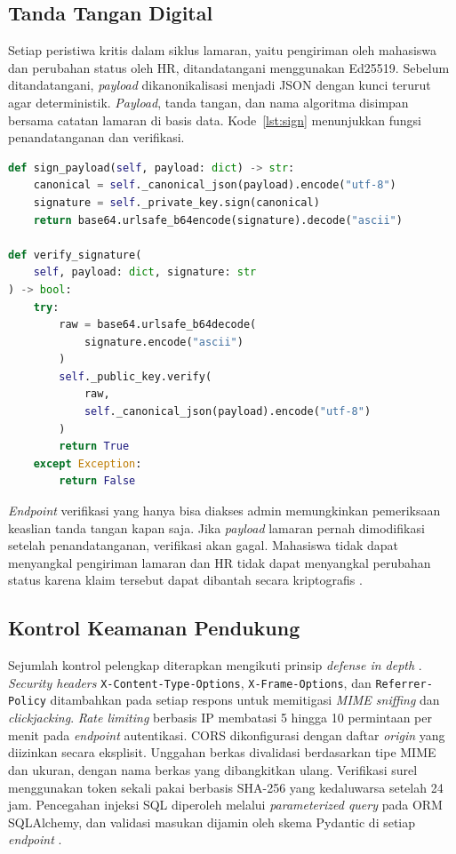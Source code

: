 \documentclass[12pt,a4paper]{article}
\begin{document}
\subsection{Tanda Tangan Digital}

Setiap peristiwa kritis dalam siklus lamaran, yaitu pengiriman oleh
mahasiswa dan perubahan status oleh HR, ditandatangani menggunakan
Ed25519. Sebelum ditandatangani, \textit{payload} dikanonikalisasi
menjadi JSON dengan kunci terurut agar deterministik. \textit{Payload},
tanda tangan, dan nama algoritma disimpan bersama catatan lamaran di
basis data. Kode~\ref{lst:sign} menunjukkan fungsi penandatanganan dan
verifikasi.

\begin{lstlisting}[language=Python,
  caption={Penandatanganan payload kanonik dan verifikasi tanda
           tangan Ed25519 untuk jaminan non-repudiasi},
  label={lst:sign}]
def sign_payload(self, payload: dict) -> str:
    canonical = self._canonical_json(payload).encode("utf-8")
    signature = self._private_key.sign(canonical)
    return base64.urlsafe_b64encode(signature).decode("ascii")

def verify_signature(
    self, payload: dict, signature: str
) -> bool:
    try:
        raw = base64.urlsafe_b64decode(
            signature.encode("ascii")
        )
        self._public_key.verify(
            raw,
            self._canonical_json(payload).encode("utf-8")
        )
        return True
    except Exception:
        return False
\end{lstlisting}

\textit{Endpoint} verifikasi yang hanya bisa diakses admin memungkinkan
pemeriksaan keaslian tanda tangan kapan saja. Jika \textit{payload}
lamaran pernah dimodifikasi setelah penandatanganan, verifikasi akan
gagal. Mahasiswa tidak dapat menyangkal pengiriman lamaran dan HR tidak
dapat menyangkal perubahan status karena klaim tersebut dapat dibantah
secara kriptografis \citep{Bernstein2012, RFC8032}.

\subsection{Kontrol Keamanan Pendukung}

Sejumlah kontrol pelengkap diterapkan mengikuti prinsip
\textit{defense in depth} \citep{Anderson2020}. \textit{Security
headers} \texttt{X-Content-Type-Options}, \texttt{X-Frame-Options},
dan \texttt{Referrer-Policy} ditambahkan pada setiap respons untuk
memitigasi \textit{MIME sniffing} dan \textit{clickjacking}.
\textit{Rate limiting} berbasis IP membatasi 5 hingga 10 permintaan
per menit pada \textit{endpoint} autentikasi. CORS dikonfigurasi
dengan daftar \textit{origin} yang diizinkan secara eksplisit.
Unggahan berkas divalidasi berdasarkan tipe MIME dan ukuran, dengan
nama berkas yang dibangkitkan ulang. Verifikasi surel menggunakan
token sekali pakai berbasis SHA-256 yang kedaluwarsa setelah 24 jam.
Pencegahan injeksi SQL diperoleh melalui \textit{parameterized query}
pada ORM SQLAlchemy, dan validasi masukan dijamin oleh skema Pydantic
di setiap \textit{endpoint} \citep{OWASP2021}.
\end{document}
